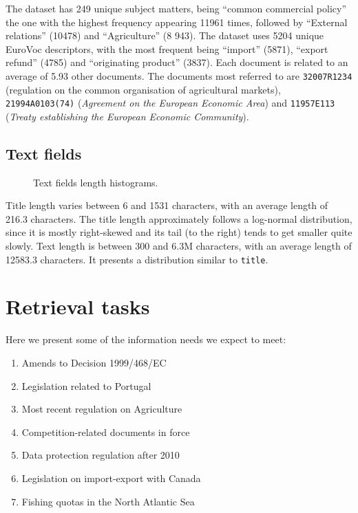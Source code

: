 \documentclass[sigconf, authorversion]{acmart}
\begin{document}
The dataset has 249 unique subject matters, being ``common commercial policy'' the one with the highest frequency appearing \SI{11961}{} times, followed by ``External relations'' (\SI{10478}{}) and ``Agriculture'' (8 943).
The dataset uses \SI{5204}{} unique EuroVoc descriptors, with the most frequent being ``import''  (\SI{5871}{}), ``export refund'' (\SI{4785}{}) and ``originating product'' (\SI{3837}{}).
Each document is related to an average of 5.93 other documents. The documents most referred to are \texttt{32007R1234} (regulation on the common organisation of agricultural markets), \texttt{21994A0103(74)} (\textit{Agreement on the European Economic Area}) and \texttt{11957E113} (\textit{Treaty establishing the European Economic Community}).

\subsection{Text fields}

\begin{figure}[ht]
    \centering
    \begin{minipage}[t]{0.5\linewidth}
        \centering
        
    \end{minipage}%
    \begin{minipage}[t]{0.5\linewidth}
        \centering
        
    \end{minipage}
    \caption{Text fields length histograms.}
\end{figure}

Title length varies between 6 and \SI{1531}{} characters, with an average length of 216.3 characters. The title length approximately follows a log-normal distribution, since it is mostly right-skewed and its tail (to the right) tends to get smaller quite slowly.
Text length is between 300 and 6.3M characters, with an average length of \SI{12583.3}{} characters. It presents a distribution similar to \texttt{title}.

\pagebreak

\section{Retrieval tasks}
\label{sec:retrieval-tasks}

Here we present some of the information needs we expect to meet:

\begin{enumerate}
    \item Amends to Decision 1999/468/EC
    \item Legislation related to Portugal
    \item Most recent regulation on Agriculture
    \item Competition-related documents in force
    \item Data protection regulation after 2010
    \item Legislation on import-export with Canada
    \item Fishing quotas in the North Atlantic Sea
\end{enumerate}
\end{document}
